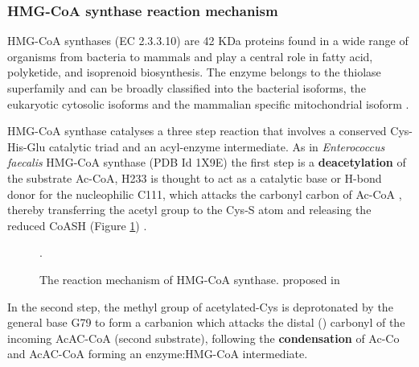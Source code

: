 		\subsubsection{HMG-CoA synthase reaction mechanism}
		\label{sec:HCSreact}
		HMG-CoA synthases (EC 2.3.3.10) are 42 KDa proteins found in a wide range of organisms from bacteria to mammals and play a central role in fatty acid, polyketide, and isoprenoid biosynthesis. The enzyme belongs to the thiolase superfamily and can be broadly classified into the bacterial isoforms, the eukaryotic cytosolic isoforms and the mammalian specific mitochondrial isoform \parencite{Shafqat2010}.
	
		HMG-CoA synthase catalyses a three step reaction that involves a conserved Cys-His-Glu catalytic triad and an acyl-enzyme intermediate. As in \textit{Enterococcus faecalis} HMG-CoA synthase (PDB Id 1X9E) the first step is a \textbf{deacetylation} of the substrate Ac-CoA, H233 is thought to act as a catalytic base or H-bond donor for the nucleophilic C111, which attacks the carbonyl carbon of Ac-CoA , thereby transferring the acetyl group to the Cys-S atom and releasing the reduced CoASH (Figure  \ref{fig:HMGCO-Areact}) \parencite{Steussy2005}.

		\setlength\fboxsep{5pt}
		\setlength\fboxrule{1.5pt}
		\begin{figure}[]
		\centering
		\caption[The reaction mechanism of HMG-CoA synthase.]{The reaction mechanism of HMG-CoA synthase. proposed in \parencite{Steussy2005}}.
		\label{fig:HMGCO-Areact}
		\end{figure}				
	
		In the second step, the methyl group of acetylated-Cys is deprotonated by the general base G79 to form a carbanion which attacks the distal (\bet) carbonyl of the incoming AcAC-CoA (second substrate), following the \textbf{condensation} of Ac-Co and AcAC-CoA forming an enzyme:HMG-CoA intermediate.
	

